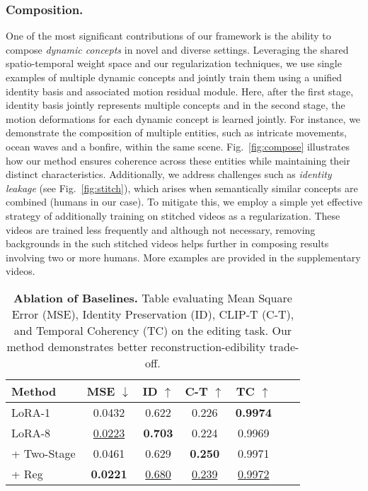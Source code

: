 \subsubsection{Composition.} One of the most significant contributions of our framework is the ability to compose \textit{dynamic concepts} in novel and diverse settings. Leveraging the shared spatio-temporal weight space and our regularization techniques, we use single examples of multiple dynamic concepts and jointly train them using a unified identity basis and associated motion residual module. Here, after the first stage, identity basis jointly represents multiple concepts and in the second stage, the motion deformations for each dynamic concept is learned jointly. For instance, we demonstrate the composition of multiple entities, such as intricate movements, ocean waves and a bonfire, within the same scene. Fig.~\ref{fig:compose} illustrates how our method ensures coherence across these entities while maintaining their distinct characteristics. Additionally, we address challenges such as \textit{identity leakage} (see Fig.~\ref{fig:stitch}), which arises when semantically similar concepts are combined (humans in our case). To mitigate this, we employ a simple yet effective strategy of additionally training on stitched videos as a regularization. These videos are trained less frequently and although not necessary, removing backgrounds in the such stitched videos helps further in composing results involving two or more humans. More examples are provided in the supplementary videos.








\begin{table}[h]
\centering
\caption{\textbf{Ablation of Baselines.} Table evaluating Mean Square Error (MSE), Identity Preservation (ID), CLIP-T (C-T), and Temporal Coherency (TC) on the editing task. Our method demonstrates better reconstruction-edibility trade-off.}
\label{tab:ablation_results}
\begin{tabular}{lcccccc}
\toprule
\textbf{Method} & \textbf{MSE $\downarrow$} & \textbf{ID $\uparrow$} & \textbf{C-T $\uparrow$}  & \textbf{TC $\uparrow$}\\
\midrule
LoRA-1 & 0.0432  & 0.622  &0.226 & \textbf{0.9974}\\
LoRA-8  & \underline{0.0223}  & \textbf{0.703} & 0.224  & 0.9969 \\
+ Two-Stage & 0.0461  & 0.629 & \textbf{0.250} &  0.9971 \\
+ Reg       & \textbf{0.0221} & \underline{0.680}  & \underline{0.239}  & \underline{0.9972} \\

\bottomrule
\end{tabular}
\end{table}

